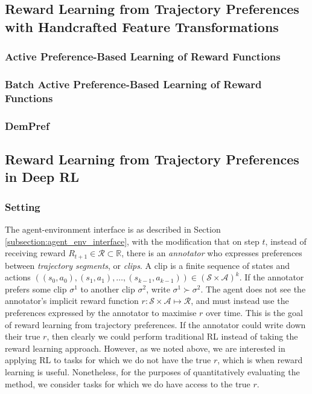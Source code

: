 \documentclass[11pt, a4paper, bibliography=totoc]{report}
\newcommand{\reals}{\mathbb{R}}
\begin{document}
\subsection{Reward Learning from Trajectory Preferences with Handcrafted Feature Transformations}

\subsubsection{Active Preference-Based Learning of Reward Functions}

\subsubsection{Batch Active Preference-Based Learning of Reward Functions}

\subsubsection{DemPref}

\subsection{Reward Learning from Trajectory Preferences in Deep RL}

\subsubsection{Setting}
The agent-environment interface is as described in Section \ref{subsection:agent_env_interface}, with the modification that on step $ t $, instead of receiving reward $ R_{t+1} \in \mathcal{R} \subset \reals $, there is an \textit{annotator} who expresses preferences between \textit{trajectory segments}, or \textit{clips}. A clip is a finite sequence of states and actions $ ((s_0,a_0), (s_1,a_1),\dots,(s_{k-1},a_{k-1})) \in (\mathcal{S} \times \mathcal{A})^k $. If the annotator prefers some clip $ \sigma^1 $ to another clip $ \sigma^2 $, write $ \sigma^1 \succ \sigma^2 $. The agent does not see the annotator's implicit reward function $ r : \mathcal{S} \times \mathcal{A} \mapsto \mathcal{R} $, and must instead use the preferences expressed by the annotator to maximise $ r $ over time. This is the goal of reward learning from trajectory preferences.
If the annotator could write down their true $ r $, then clearly we could perform traditional RL instead of taking the reward learning approach. However, as we noted above, we are interested in applying RL to tasks for which we do not have the true $ r $, which is when reward learning is useful. Nonetheless, for the purposes of quantitatively evaluating the method, we consider tasks for which we do have access to the true $ r $.
\end{document}
